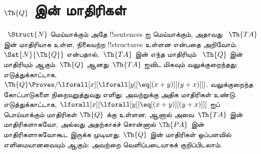 \documentclass[../../../include/open-logic-section]{subfiles}
\begin{document}

\section{$\Th{Q}$ இன் மாதிரிகள்}

\begin{explain}
~$\Struct{N}$ மெய்யாக்கும் அதே !!{sentence}s ஐ மெய்யாக்கும், அதாவது
~$\Th{TA}$ இன் மாதிரியாக உள்ள, நிலையற்ற !!{structure}s உள்ளன என்பதை
அறிவோம். $\Sat{N}{\Th{Q}}$ என்பதால்,~$\Th{TA}$ இன் எந்த மாதிரியும்
~$\Th{Q}$ இன் மாதிரியும் ஆகும். $\Th{Q}$ ஆனது~$\Th{TA}$ ஐவிட
மிகவும் வலுக்குறைந்தது; எடுத்துக்காட்டாக,
$\Th{Q} \Proves/ \lforall[x][\lforall[y][\eq[(x +
      y)][(y+x)]]]$. வலுக்குறைந்த கோட்பாடுகளை நிறைவுறுத்துவது எளிது:
அவற்றுக்கு அதிக மாதிரிகள் உண்டு. எடுத்துக்காட்டாக,
$\lforall[x][\lforall[y][\eq[(x + y)][(y+x)]]]$ ஐப் பொய்யாக்கும்
மாதிரிகள் $\Th{Q}$ க்கு உள்ளன; ஆனால் அவை~$\Th{TA}$ இன் மாதிரிகளாகவோ,
அல்லது அதற்காகச் சொன்னால் $\Th{PA}$ இன் மாதிரிகளாகவோகூட இருக்க
முடியாது. $\Th{Q}$ இன் மாதிரிகள் ஒப்பளவில் எளிமையானவையும் ஆகும்:
அவற்றை வெளிப்படையாகக் குறிப்பிடலாம்.
\end{explain}
\end{document}
